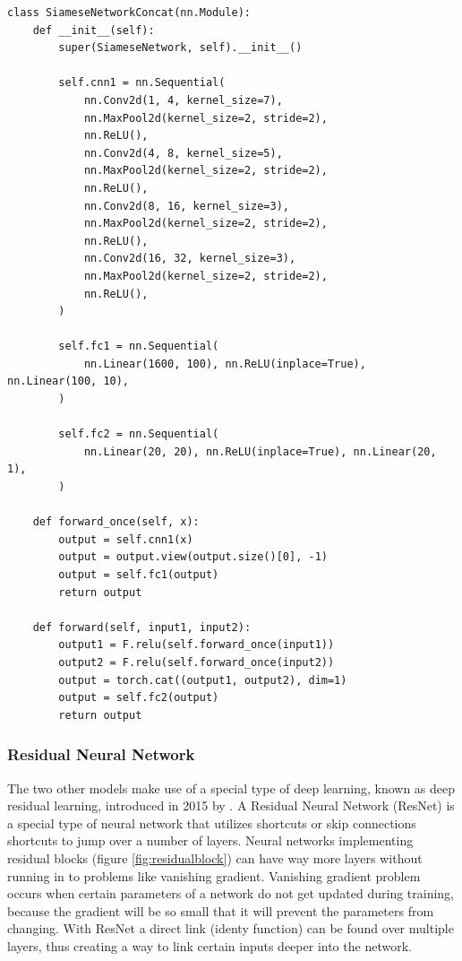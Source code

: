  \begin{lstlisting}[caption={Code for CNN with Cross Entropy Loss}, label={lst:cnncel}, frame=single, breaklines=true]
 class SiameseNetworkConcat(nn.Module):
    def __init__(self):
        super(SiameseNetwork, self).__init__()

        self.cnn1 = nn.Sequential(
            nn.Conv2d(1, 4, kernel_size=7),
            nn.MaxPool2d(kernel_size=2, stride=2),
            nn.ReLU(),
            nn.Conv2d(4, 8, kernel_size=5),
            nn.MaxPool2d(kernel_size=2, stride=2),
            nn.ReLU(),
            nn.Conv2d(8, 16, kernel_size=3),
            nn.MaxPool2d(kernel_size=2, stride=2),
            nn.ReLU(),
            nn.Conv2d(16, 32, kernel_size=3),
            nn.MaxPool2d(kernel_size=2, stride=2),
            nn.ReLU(),
        )

        self.fc1 = nn.Sequential(
            nn.Linear(1600, 100), nn.ReLU(inplace=True), nn.Linear(100, 10),
        )

        self.fc2 = nn.Sequential(
            nn.Linear(20, 20), nn.ReLU(inplace=True), nn.Linear(20, 1),
        )

    def forward_once(self, x):
        output = self.cnn1(x)
        output = output.view(output.size()[0], -1)
        output = self.fc1(output)
        return output

    def forward(self, input1, input2):
        output1 = F.relu(self.forward_once(input1))
        output2 = F.relu(self.forward_once(input2))
        output = torch.cat((output1, output2), dim=1)
        output = self.fc2(output)
        return output
 \end{lstlisting}

\subsubsection{Residual Neural Network}
The two other models make use of a special type of deep learning, known as deep residual learning, introduced in 2015 by \cite{he2016deep}. A Residual Neural Network (ResNet) is a special type of neural network that utilizes shortcuts or skip connections shortcuts to jump over a number of layers. Neural networks implementing residual blocks (figure \ref{fig:residualblock}) can have way more layers without running in to problems like vanishing gradient. Vanishing gradient problem occurs when certain parameters of a network do not get updated during training, because the gradient will be so small that it will prevent the parameters from changing. With ResNet a direct link (identy function) can be found over multiple layers, thus creating a way to link certain inputs deeper into the network.

